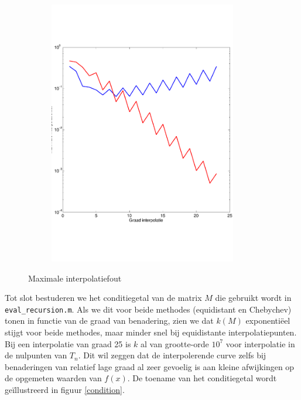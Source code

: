 \documentclass[a4paper, 12pt, titlepage]{report}
\begin{document}
\begin{figure}
\begin{subfigure}{0.5\textwidth}
 \includegraphics[width=0.9\textwidth]{maxExp.pdf}
 \end{subfigure}
 
 \caption{Maximale interpolatiefout}
 \label{maxerr}
 \end{figure}
 
 Tot slot bestuderen we het conditiegetal van de matrix $M$ die gebruikt wordt in \texttt{eval\_recursion.m}. Als we dit voor beide methodes (equidistant en Chebychev) tonen in functie van de graad van benadering, zien we dat $k(M)$ exponenti\"eel stijgt voor beide methodes, maar minder snel bij equidistante interpolatiepunten. Bij een interpolatie van graad 25 is $k$ al van grootte-orde $10^7$ voor interpolatie in de nulpunten van $T_n$. Dit wil zeggen dat de interpolerende curve zelfs bij benaderingen van relatief lage graad al zeer gevoelig is aan kleine afwijkingen op de opgemeten waarden van $f(x)$. De toename van het conditiegetal wordt ge\"illustreerd in figuur \ref{condition}.
 
\end{document}
